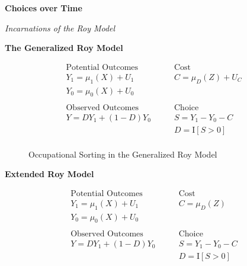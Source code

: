 \begin{frame}
\begin{center} \textbf{Choices over Time}\\\vspace{0.5cm}
\end{center}
\end{frame}

\begin{frame}\begin{center}
\LARGE\textit{Incarnations of the Roy Model}
\end{center}\end{frame}
\begin{frame}
\textbf{The Generalized Roy Model}

\begin{align*}
\text{Potential Outcomes} &\qquad \text{Cost} \\
Y_1 = \mu_1(X) + U_1      &\qquad C = \mu_D(Z) + U_C \\
Y_0 = \mu_0(X) + U_0      &\qquad \\
    & \\
\text{Observed Outcomes } &\qquad \text{Choice} \\
Y = D Y_1 + (1 - D)Y_0 &\qquad S = Y_1 - Y_0 - C \\
                       &\qquad D = \mathrm{I}[S > 0] \\
\end{align*}
\end{frame}

\begin{frame}
\begin{figure}[htp]\centering
\caption{Occupational Sorting in the Generalized Roy Model}\label{Occupational Sorting in the Generalized Roy Model}
\end{figure}
\end{frame}


\begin{frame}
\textbf{Extended Roy Model}

\begin{align*}
\text{Potential Outcomes} &\qquad \text{Cost} \\
Y_1 = \mu_1(X) + U_1      &\qquad C = \mu_D(Z) \\
Y_0 = \mu_0(X) + U_0      &\qquad \\
    & \\
\text{Observed Outcomes } &\qquad \text{Choice} \\
Y = D Y_1 + (1 - D)Y_0 &\qquad S = Y_1 - Y_0 - C \\
                       &\qquad D = \mathrm{I}[S > 0] \\
\end{align*}

\end{frame}




